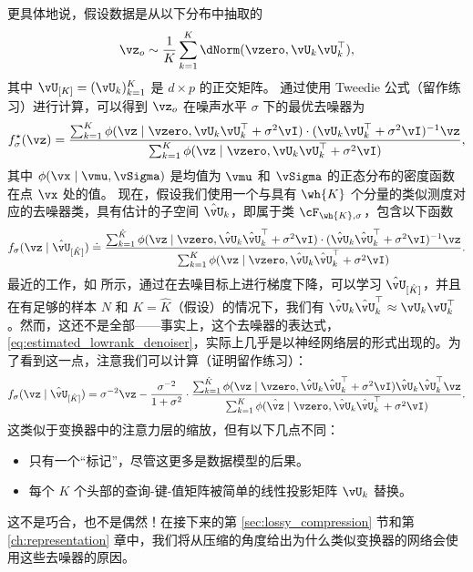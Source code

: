 \documentclass[../../book-main.tex]{subfiles}
\begin{document}
更具体地说，假设数据是从以下分布中抽取的
    \begin{equation}
        \vz_{o} \sim \frac{1}{K}\sum_{k = 1}^{K}\dNorm(\vzero, \vU_{k}\vU_{k}^{\top}),
    \end{equation}
    其中 \(\vU_{[K]} = (\vU_{k})_{k = 1}^{K}\) 是 \(d \times p\) 的正交矩阵。
    通过使用 Tweedie 公式（留作练习）进行计算，可以得到 \(\vz_{o}\) 在噪声水平 \(\sigma\) 下的最优去噪器为
    \begin{equation}
        f_{\sigma}^{\star}(\vz) = \frac{\sum_{k = 1}^{K}\phi(\vz \mid \vzero, \vU_{k}\vU_{k}^{\top} + \sigma^{2}\vI)\cdot (\vU_{k}\vU_{k}^{\top} + \sigma^{2}\vI)^{-1}\vz}{\sum_{k = 1}^{K}\phi(\vz \mid \vzero, \vU_{k}\vU_{k}^{\top} + \sigma^{2}\vI)},
    \end{equation}
    其中 \(\phi(\vx \mid \vmu, \vSigma)\) 是均值为 \(\vmu\) 和 \(\vSigma\) 的正态分布的密度函数在点 \(\vx\) 处的值。
    现在，假设我们使用一个与具有 \(\wh{K}\) 个分量的类似测度对应的去噪器类，具有估计的子空间 \(\hat{\vU}_{k}\)，即属于类 \(\cF_{\wh{K}, \sigma}\)，包含以下函数
    \begin{equation}\label{eq:estimated_lowrank_denoiser}
        f_{\sigma}(\vz \mid \hat{\vU}_{[\hat{K}]}) \doteq \frac{\sum_{k = 1}^{\hat{K}}\phi(\vz \mid \vzero, \hat{\vU}_{k}\hat{\vU}_{k}^{\top} + \sigma^{2}\vI)\cdot (\hat{\vU}_{k}\hat{\vU}_{k}^{\top} + \sigma^{2}\vI)^{-1}\vz}{\sum_{k = 1}^{K}\phi(\vz \mid \vzero, \hat{\vU}_{k}\hat{\vU}_{k}^{\top} + \sigma^{2}\vI)}.
    \end{equation}
    最近的工作，如 \cite{wang2024diffusion} 所示，通过在去噪目标上进行梯度下降，可以学习 \(\hat{\vU}_{[\hat{K}]}\)，并且在有足够的样本 \(N\) 和 \(K = \hat{K}\)（假设）的情况下，我们有 \(\hat{\vU}_{k}\hat{\vU}_{k}^{\top} \approx \vU_{k}\vU_{k}^{\top}\)。然而，这还不是全部——事实上，这个去噪器的表达式，\eqref{eq:estimated_lowrank_denoiser}，实际上几乎是以神经网络层的形式出现的。为了看到这一点，注意我们可以计算（证明留作练习）：
    \begin{equation}
        f_{\sigma}(\vz \mid \hat{\vU}_{[\hat{K}]}) = \sigma^{-2}\vz - \frac{\sigma^{-2}}{1 + \sigma^{2}}\cdot\frac{\sum_{k = 1}^{\hat{K}}\phi(\vz \mid \vzero, \hat{\vU}_{k}\hat{\vU}_{k}^{\top} + \sigma^{2}\vI)\hat{\vU}_{k}\hat{\vU}_{k}^{\top}\vz}{\sum_{k = 1}^{K}\phi(\hat{\vz} \mid \vzero, \hat{\vU}_{k}\hat{\vU}_{k}^{\top} + \sigma^{2}\vI)}.
    \end{equation}
    这类似于变换器中的注意力层的缩放，但有以下几点不同：
    \begin{itemize}
        \item 只有一个“标记”，尽管这更多是数据模型的后果。
        \item 每个 \(K\) 个头部的查询-键-值矩阵被简单的线性投影矩阵 \(\vU_{k}\) 替换。
    \end{itemize}
    这不是巧合，也不是偶然！在接下来的第 \ref{sec:lossy_compression} 节和第 \ref{ch:representation} 章中，我们将从压缩的角度给出为什么类似变换器的网络会使用这些去噪器的原因。
\end{document}
